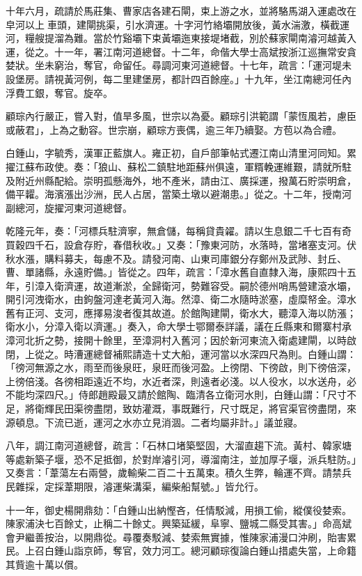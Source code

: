 \begin{pinyinscope}
十年六月，疏請於馬莊集、曹家店各建石閘，束上游之水，並將駱馬湖入運處改在皁河以上車頭，建閘挑渠，引水濟運。十字河竹絡壩開放後，黃水湍激，橫截運河，糧艘提溜為難。當於竹谿壩下束黃壩迤東接堤堵截，別於蘇家閘南濬河越黃入運，從之。十一年，署江南河道總督。十二年，命偕大學士高斌按浙江巡撫常安貪婪狀。坐未窮治，奪官，命留任。尋調河東河道總督。十七年，疏言：「運河堤未設堡房。請視黃河例，每二里建堡房，都計四百餘座。」十九年，坐江南總河任內浮費工銀，奪官。旋卒。

顧琮內行嚴正，嘗入對，值旱多風，世宗以為憂。顧琮引洪範謂「蒙恆風若，慮臣或蔽君」，上為之動容。世宗崩，顧琮方喪偶，逾三年乃續娶。方苞以為合禮。

白鍾山，字毓秀，漢軍正藍旗人。雍正初，自戶部筆帖式遷江南山清里河同知。累擢江蘇布政使。奏：「狼山、蘇松二鎮駐地距蘇州俱遠，軍糈輓運維艱，請就所駐及附近州縣配給。崇明孤懸海外，地不產米，請由江、廣採運，撥萬石貯崇明倉，備平糶。海濱漲出沙洲，民人占居，當築土墩以避潮患。」從之。十二年，授南河副總河，旋擢河東河道總督。

乾隆元年，奏：「河標兵駐濟寧，無倉儲，每稱貸貴糴。請以生息銀二千七百有奇買穀四千石，設倉存貯，春借秋收。」又奏：「豫東河防，水落時，當堵塞支河。伏秋水漲，購料募夫，每慮不及。請發河南、山東司庫銀分存鄭州及武陟、封丘、曹、單諸縣，永遠貯備。」皆從之。四年，疏言：「漳水舊自直隸入海，康熙四十五年，引漳入衛濟運，故道漸淤，全歸衛河，勢難容受。嗣於德州哨馬營建滾水壩，開引河洩衛水，由鉤盤河達老黃河入海。然漳、衛二水隨時淤塞，虛糜帑金。漳水舊有正河、支河，應擇易浚者復其故道。於館陶建閘，衛水大，聽漳入海以防漲；衛水小，分漳入衛以濟運。」奏入，命大學士鄂爾泰詳議，議在丘縣東和爾寨村承漳河北折之勢，接開十餘里，至漳洞村入舊河；因於新河東流入衛處建閘，以時啟閉，上從之。時漕運總督補熙請造十丈大船，運河當以水深四尺為則。白鍾山謂：「徬河無源之水，雨至而後泉旺，泉旺而後河盈。上徬閉、下徬啟，則下徬倍深，上徬倍淺。各徬相距遠近不均，水近者深，則遠者必淺。以人役水，以水送舟，必不能均深四尺。」侍郎趙殿最又請於館陶、臨清各立衛河水則，白鍾山謂：「尺寸不足，將衛輝民田渠徬盡閉，致妨灌溉，事既難行，尺寸既足，將官渠官徬盡閉，來源頓息。下流已逝，運河之水亦立見消涸。二者均屬非計。」議並寢。

八年，調江南河道總督，疏言：「石林口堵築堅固，大溜直趨下流。黃村、韓家塘等處新築子堰，恐不足抵御，於對岸濬引河，導溜南注，並加厚子堰，派兵駐防。」又奏言：「葦蕩左右兩營，歲輸柴二百二十五萬束。積久生弊，輪運不齊。請禁兵民雜採，定採葦期限，濬運柴溝渠，編柴船幫號。」皆允行。

十一年，御史楊開鼎劾：「白鍾山出納慳吝，任情駁減，用損工偷，縱僕役婪索。陳家浦決七百餘丈，止稱二十餘丈。興築延緩，阜寧、鹽城二縣受其害。」命高斌會尹繼善按治，以開鼎從。尋覆奏駁減、婪索無實據，惟陳家浦漫口沖刷，貽害累民。上召白鍾山詣京師，奪官，效力河工。總河顧琮復論白鍾山措處失當，上命籍其貲逾十萬以償。


\end{pinyinscope}
